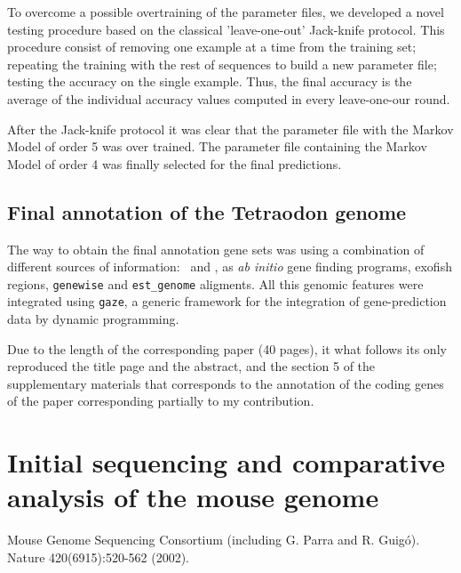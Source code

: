 To overcome a possible overtraining of the parameter files, we
developed a novel testing procedure based on the classical
'leave-one-out' Jack-knife protocol. This procedure consist of
removing one example at a time from the training set; repeating the
training with the rest of sequences to build a new parameter file;
testing the accuracy on the single example. Thus, the final accuracy
is the average of the individual accuracy values computed in every
leave-one-our round.

After the Jack-knife protocol it was clear that the parameter file
with the Markov Model of order 5 was over trained. The parameter file
containing the Markov Model of order 4 was finally selected for the
final predictions.





\subsection*{Final annotation of the Tetraodon genome}
The way to obtain the final annotation gene sets was using a
combination of different sources of information: \geneid\ and
\genscan, as \textit{ab initio} gene finding programs, exofish 
regions, \texttt{genewise} and \texttt{est\_genome} aligments. All
this genomic features were integrated using \texttt{gaze}, a generic
framework for the integration of gene-prediction data by dynamic
programming.

Due to the length of the corresponding paper (40 pages), it what
follows its only reproduced the title page and the abstract, and the
section 5 of the supplementary materials that corresponds to the
annotation of the coding genes of the paper corresponding partially to
my contribution.

\clearemptydoublepage




\newpage
\section*{Initial sequencing and comparative analysis of the mouse genome}
Mouse Genome Sequencing Consortium (including G. Parra and R. Guig\'o).\\
Nature 420(6915):520-562 (2002). \\

